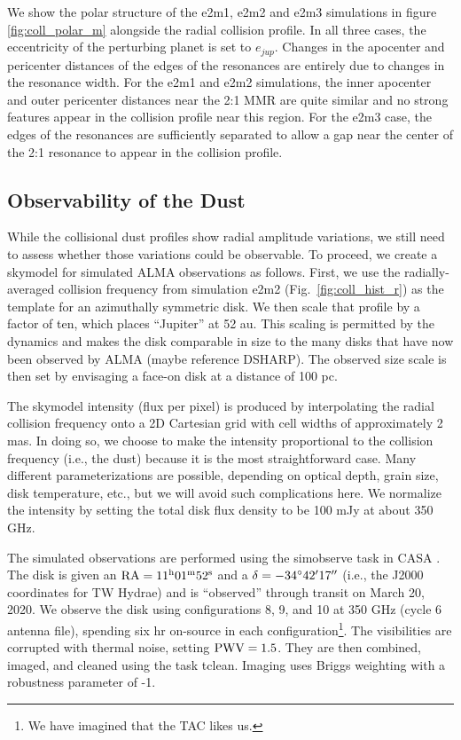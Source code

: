 \documentclass[twocolumn]{aastex63}
\begin{document}
We show the polar structure of the e2m1, e2m2 and e2m3 simulations in figure \ref{fig:coll_polar_m} alongside the radial collision profile. In all three 
cases, the eccentricity of the perturbing planet is set to $e_{jup}$. Changes in the apocenter and pericenter distances of the edges of the 
resonances are entirely due to changes in the resonance width. For the e2m1 and e2m2 simulations, the inner apocenter and outer pericenter 
distances near the 2:1 MMR are quite similar and no strong features appear in the collision profile near this region. For the e2m3 case, the edges of 
the resonances are sufficiently separated to allow a gap near the center of the 2:1 resonance to appear in the collision profile.

\subsection{Observability of the Dust}

While the collisional dust profiles show radial amplitude variations, we still need to assess whether those variations could be observable.  
To proceed, we create a skymodel for simulated ALMA observations as follows. First, we use the radially-averaged collision frequency from simulation e2m2 (Fig.~\ref{fig:coll_hist_r}) as the template for an azimuthally symmetric disk.  
We then scale that profile by a factor of ten, which places ``Jupiter'' at 52 au.  
This scaling is permitted by the dynamics and makes the disk comparable in size to the many disks that have now been observed by ALMA (maybe reference DSHARP).  
The observed size scale is then set by envisaging a face-on disk at a distance of 100 pc.  

The skymodel intensity (flux per pixel) is produced by interpolating the radial collision frequency onto a 2D Cartesian grid with cell widths of approximately 2 mas. 
In doing so, we choose to make the intensity proportional to the collision frequency (i.e., the dust) because it is the most straightforward case. 
Many different parameterizations are possible, depending on optical depth, grain size, disk temperature, etc., but we will avoid such complications here. 
We normalize the intensity by setting the total disk flux density to be 100 mJy at about 350 GHz.  

The simulated observations are performed using the {simobserve} task in {\sc CASA} \citep{2007ASPC..376..127M}.  The disk is given an $\rm RA = 11^{\rm h} 01^{\rm m} 52^{\rm s}$ and a $\delta = -34^\circ 42\mbox{$^\prime$} 17\mbox{$^{\prime\prime}$}$ (i.e., the J2000 coordinates for TW Hydrae) and is ``observed'' through transit on March 20, 2020. 
We observe the disk using configurations 8, 9, and 10 at 350 GHz (cycle 6 antenna file), spending six hr on-source in each configuration\footnote{We have imagined that the TAC likes us.}.  
The visibilities are corrupted with thermal noise, setting $\rm PWV=1.5$. 
They are then combined, imaged, and cleaned using the task tclean. Imaging uses Briggs weighting with a robustness parameter of -1. 
\end{document}
